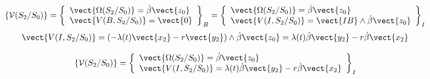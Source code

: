\ifprof%
\begin{corrige}
$$\{\mathcal{V}(S_2/S_0)\} = 
\left\{
\begin{array}{l}
\vect{\Omega(S_2/S_0)} = \dot{\beta}\vect{z_0} \\
\vect{V(B,S_2/S_0)} = \vect{0}
\end{array}
\right\}_B =
\left\{
\begin{array}{l}
\vect{\Omega(S_2/S_0)} = \dot{\beta}\vect{z_0} \\
\vect{V(I,S_2/S_0)} = \vect{IB} \wedge \dot{\beta}\vect{z_0}
\end{array}
\right\}_I
$$
$$
\vect{V(I,S_2/S_0)} =\left( -\lambda(t)\vect{x_2} - r \vect{y_2} \right) \wedge \dot{\beta}\vect{z_0} = \lambda(t) \dot{\beta}\vect{y_2} - r\dot{\beta}\vect{x_2}
$$

$$\{\mathcal{V}(S_2/S_0)\} = 
\left\{
\begin{array}{l}
\vect{\Omega(S_2/S_0)} = \dot{\beta}\vect{z_0} \\
\vect{V(I,S_2/S_0)} = \lambda(t) \dot{\beta}\vect{y_2} - r\dot{\beta}\vect{x_2}
\end{array}
\right\}_I
$$

\end{corrige}
\else \fi


